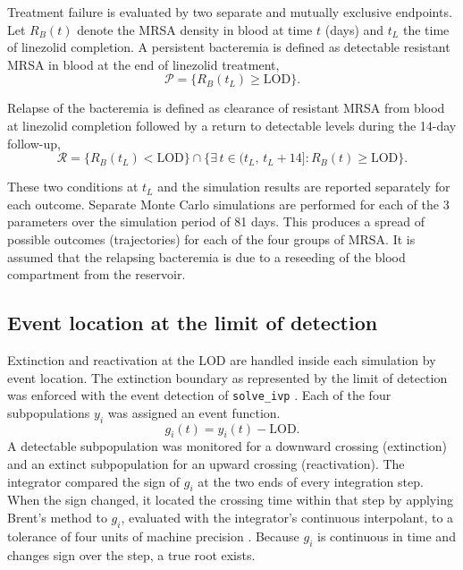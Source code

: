 \documentclass[12pt, draftcls, onecolumn]{IEEEtran}
\begin{document}
Treatment failure is evaluated by two separate and mutually exclusive endpoints.
Let $R_B(t)$ denote the MRSA density in blood at time $t$ (days) and $t_L$ the time of linezolid completion.
A persistent bacteremia is defined as detectable resistant MRSA in blood at
the end of linezolid treatment,
\begin{equation}
    \mathcal{P} = \Big\{ R_B(t_L) \ge \mathrm{LOD} \Big\}.
    \label{eq:persistence}
\end{equation}

Relapse of the bacteremia is defined as clearance of resistant MRSA from
blood at linezolid completion followed by a return to detectable levels
during the 14-day follow-up,
\begin{equation}
    \mathcal{R} = \Big\{ R_B(t_L) < \mathrm{LOD} \Big\} \cap
    \Big\{ \exists\, t \in (t_L,\, t_L + 14] : R_B(t) \ge \mathrm{LOD} \Big\}.
    \label{eq:relapse}
\end{equation}

These two conditions at $t_L$ and the simulation results are reported separately for each outcome.
Separate Monte Carlo simulations are performed for each of the 3 parameters over the simulation period of 81 days.
This produces a spread of possible outcomes (trajectories) for each of the four groups of MRSA.
It is assumed that the relapsing bacteremia is due to a reseeding of the blood compartment from the reservoir.

\subsection{Event location at the limit of detection}
\label{sec:event-location}

Extinction and reactivation at the LOD are handled inside each simulation by
event location. The extinction boundary as represented by the limit of detection was enforced with the event detection of
\texttt{solve\_ivp} \cite{2020SciPy-NMeth}. Each of the four subpopulations
$y_i$ was assigned an event function.
\begin{equation}
    g_i(t) = y_i(t) - \mathrm{LOD}.
    \label{eq:lod-event}
\end{equation}
A detectable
subpopulation was monitored for a downward crossing (extinction) and an
extinct subpopulation for an upward crossing (reactivation). The integrator
compared the sign of $g_i$ at the two ends of every integration step. When the
sign changed, it located the crossing time within that step by applying
Brent's method to $g_i$, evaluated with the integrator's continuous
interpolant, to a tolerance of four units of machine precision
\cite{scipy_docs,WolframEventDetection}. Because $g_i$ is continuous in time
and changes sign over the step, a true root exists.
\end{document}
